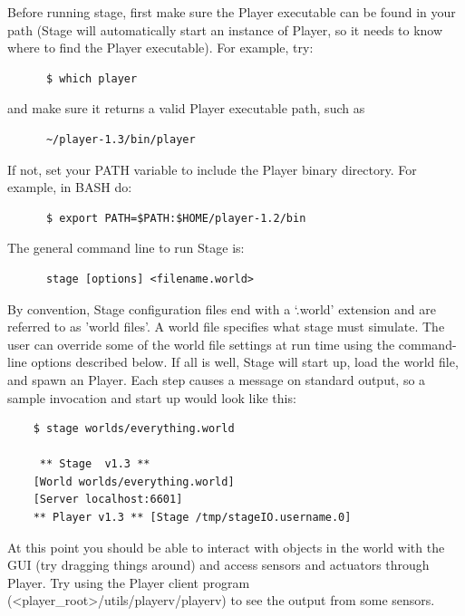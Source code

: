 \documentclass[11pt,twoside]{report}
\begin{document}
    Before running stage, first make sure the Player executable can be
    found in your path (Stage will automatically start an instance of
    Player, so it needs to know where to find the Player executable).
    For example, try:
      \begin{verbatim}
      $ which player
      \end{verbatim}
    and make sure it returns a valid Player executable path, such as
      \begin{verbatim}
      ~/player-1.3/bin/player
      \end{verbatim}
    If not, set your PATH variable to include the Player binary directory. 
    For example, in BASH do:
      \begin{verbatim}  
      $ export PATH=$PATH:$HOME/player-1.2/bin
      \end{verbatim}  

    The general command line to run Stage is: 
      \begin{verbatim} 
      stage [options] <filename.world> 
      \end{verbatim} 

    By convention, Stage configuration files end with a `.world'
    extension and are referred to as 'world files'. A world file
    specifies what stage must simulate. The user can override some of
    the world file settings at run time using the command-line options
    described below. If all is well, Stage will start up, load the
    world file, and spawn an Player. Each step causes a message on
    standard output, so a sample invocation and start up would look
    like this:

	\begin{verbatim} 
	$ stage worlds/everything.world

	 ** Stage  v1.3 ** 
	[World worlds/everything.world]
	[Server localhost:6601]
	** Player v1.3 ** [Stage /tmp/stageIO.username.0]
      \end{verbatim}

    At this point you should be able to interact with objects in the
    world with the GUI (try dragging things around) and access sensors
    and actuators through Player. Try using the Player client program
    (<player\_root>/utils/playerv/playerv) to see the output from some
    sensors.

  
\end{document}
